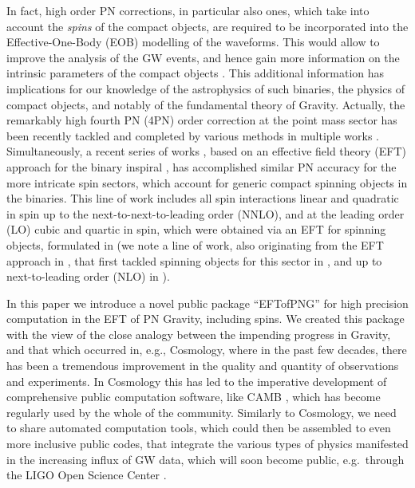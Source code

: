 \documentclass[a4paper,11pt]{article}
\begin{document}
In fact, high order PN corrections, in particular also ones, which take into account the 
\textit{spins} of the compact objects, are required to be incorporated into the 
Effective-One-Body (EOB) \cite{Buonanno:1998gg} modelling of the waveforms. This would allow 
to improve the analysis of the GW events, and hence gain more information on the intrinsic 
parameters of the compact objects \cite{TheLIGOScientific:2016wfe, Abbott:2016izl}. This 
additional information has implications for our knowledge of the astrophysics of such 
binaries, the physics of compact objects, and notably of the fundamental theory of Gravity. 
Actually, the remarkably high fourth PN (4PN) order correction at the point mass sector has 
been recently tackled and completed by various methods in multiple works 
\cite{Jaranowski:2012eb,Foffa:2012rn,Jaranowski:2013lca,Damour:2014jta,Damour:2016abl,Bernard:2015njp,Bernard:2016wrg,Damour:2017ced,Foffa:2016rgu}. 
Simultaneously, a recent series of works 
\cite{Levi:2011eq,Levi:2014sba,Levi:2014gsa,Levi:2015msa,Levi:2015uxa,Levi:2015ixa,Levi:2016ofk}, 
based on an effective field theory (EFT) approach for the binary inspiral 
\cite{Goldberger:2004jt,Goldberger:2007hy}, has accomplished similar PN accuracy for the 
more intricate spin sectors, which account for generic compact spinning objects in the 
binaries. This line of work includes all spin interactions linear and quadratic in spin up 
to the next-to-next-to-leading order (NNLO), and at the leading order (LO) cubic and quartic 
in spin, which were obtained via an EFT for spinning objects, formulated in 
\cite{Levi:2015msa} (we note a line of work, also originating from the EFT approach in 
\cite{Goldberger:2004jt,Goldberger:2007hy}, that first tackled spinning objects for this 
sector in \cite{Porto:2005ac}, and up to next-to-leading order (NLO) in 
\cite{Porto:2008tb,Porto:2008jj}).

In this paper we introduce a novel public package ``EFTofPNG'' for high precision 
computation in the EFT of PN Gravity, including spins. We created this package with the view 
of the close analogy between the impending progress in Gravity, and that which occurred in, 
e.g., Cosmology, where in the past few decades, there has been a tremendous improvement in 
the quality and quantity of observations and experiments. In Cosmology this has led to the 
imperative development of comprehensive public computation software, like CAMB 
\cite{Lewis:1999bs,CAMB}, which has become regularly used by the whole of the community. 
Similarly to Cosmology, we need to share automated computation tools, which could then be 
assembled to even more inclusive public codes, that integrate the various types of 
physics manifested in the increasing influx of GW data, which will soon become public, 
e.g.~through the LIGO Open Science Center \cite{LigoLosc}. 
\end{document}
